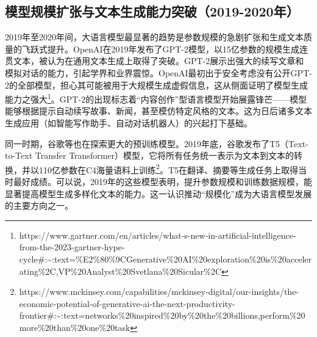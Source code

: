 \documentclass[
  letterpaper,
]{scrbook}
\begin{document}
\subsection{模型规模扩张与文本生成能力突破（2019-2020年）}\label{ux6a21ux578bux89c4ux6a21ux6269ux5f20ux4e0eux6587ux672cux751fux6210ux80fdux529bux7a81ux78342019-2020ux5e74}

2019年至2020年间，大语言模型最显著的趋势是参数规模的急剧扩张和生成文本质量的飞跃式提升。OpenAI在2019年发布了GPT-2模型，以15亿参数的规模生成连贯文本，被认为在通用文本生成上取得了突破。GPT-2展示出强大的续写文章和模拟对话的能力，引起学界和业界震惊。OpenAI最初出于安全考虑没有公开GPT-2的全部模型，担心其可能被用于大规模生成虚假信息，这从侧面证明了模型生成能力之强大\footnote{https://www.gartner.com/en/articles/what-s-new-in-artificial-intelligence-from-the-2023-gartner-hype-cycle\#:\textasciitilde:text=\%E2\%80\%9CGenerative\%20AI\%20exploration\%20is\%20accelerating\%2C,VP\%20Analyst\%20Svetlana\%20Sicular\%2C}。GPT-2的出现标志着``内容创作''型语言模型开始展露锋芒------模型能够根据提示自动续写故事、新闻，甚至模仿特定风格的文本。这为日后诸多文本生成应用（如智能写作助手、自动对话机器人）的兴起打下基础。

同一时期，谷歌等也在探索更大的预训练模型。2019年底，谷歌发布了T5（Text-to-Text
Transfer
Transformer）模型，它将所有任务统一表示为文本到文本的转换，并以110亿参数在C4海量语料上训练\footnote{https://www.mckinsey.com/capabilities/mckinsey-digital/our-insights/the-economic-potential-of-generative-ai-the-next-productivity-frontier\#:\textasciitilde:text=networks\%20inspired\%20by\%20the\%20billions,perform\%20more\%20than\%20one\%20task}。T5在翻译、摘要等生成任务上取得当时最好成绩。可以说，2019年的这些模型表明，提升参数规模和训练数据规模，能显著提高模型生成多样化文本的能力。这一认识推动``规模化''成为大语言模型发展的主要方向之一。
\end{document}

